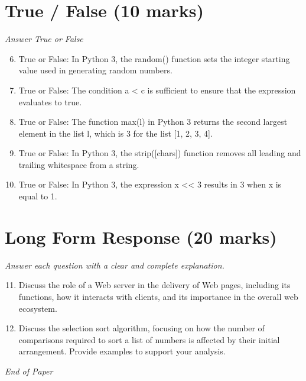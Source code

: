 \documentclass[12pt]{article}
\begin{document}
\section*{True / False (10 marks)}
\textit{Answer True or False}
\begin{enumerate}[label=\arabic*.]
\setcounter{enumi}{5}
\item True or False: In Python 3, the random() function sets the integer starting value used in generating random numbers.
\item True or False: The condition a \textless{} c is sufficient to ensure that the expression evaluates to true.
\item True or False: The function max(l) in Python 3 returns the second largest element in the list l, which is 3 for the list [1, 2, 3, 4].
\item True or False: In Python 3, the strip([chars]) function removes all leading and trailing whitespace from a string.
\item True or False: In Python 3, the expression x \textless{}\textless{} 3 results in 3 when x is equal to 1.
\end{enumerate}

\section*{Long Form Response (20 marks)}
\textit{Answer each question with a clear and complete explanation.}
\begin{enumerate}[label=\arabic*.]
\setcounter{enumi}{10}
\item Discuss the role of a Web server in the delivery of Web pages, including its functions, how it interacts with clients, and its importance in the overall web ecosystem.
\item Discuss the selection sort algorithm, focusing on how the number of comparisons required to sort a list of numbers is affected by their initial arrangement. Provide examples to support your analysis.
\end{enumerate}

\vfill
\noindent\textit{End of Paper}
\end{document}
